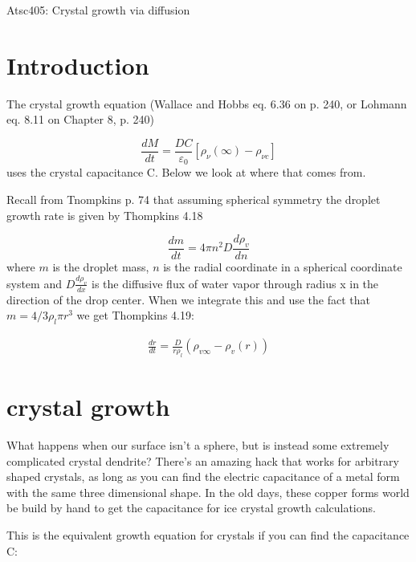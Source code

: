 \documentclass[12pt]{article}
\begin{document}
\newcommand{\vect}[1]{\boldsymbol{\vec{#1}}}
\pagestyle{first}

\begin{center}
Atsc405: Crystal growth via diffusion\\
\end{center}


\section{Introduction}
\label{sec:introduction}

The crystal growth equation (Wallace and Hobbs eq. 6.36 on p. 240, or
Lohmann eq. 8.11 on Chapter 8, p. 240)

$$
\frac{d M}{d t}=\frac{D C}{\varepsilon_0}\left[\rho_\nu(\infty)-\rho_{\nu c}\right]
$$
uses the crystal capacitance C.
Below we look at where that comes from.

Recall from Tnompkins p. 74 that assuming spherical symmetry the droplet growth rate is given
by Thompkins 4.18

\begin{equation}
  \label{eq:diff}
  \frac{ dm}{dt} = 4 \pi n^2 D \frac{ d\rho_v}{dn} 
\end{equation}
where $m$ is the droplet mass, $n$ is the radial coordinate
in a spherical coordinate system and $D \frac{ d\rho_v}{dx} $ is the
diffusive flux of water vapor through radius x in the direction
of the drop center.  When we integrate this  and use the fact that $m=4/3 \rho_l \pi r^3$
we get Thompkins 4.19:

\begin{gather}
  \label{final}
  \frac{dr}{dt} = \frac{ D}{r\rho_l}  (\rho_{v \infty} - \rho_{v}(r) )
\end{gather}


\section{crystal growth}

What happens when our surface isn't a sphere, but is instead some extremely complicated
crystal dendrite?   There's an amazing hack that works for arbitrary shaped crystals, as long
as you can find the electric capacitance of a metal form with the same three dimensional
shape.   In the old days, these copper forms world be build by hand to get the capacitance for
ice crystal growth calculations.

This is the equivalent  growth equation for crystals if you can find the capacitance C:
\end{document}
